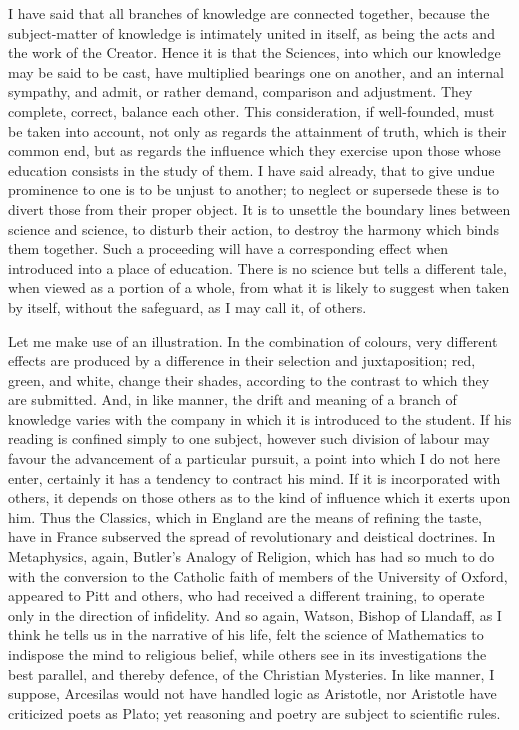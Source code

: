 I have said that all branches of knowledge are connected together,
because the subject-matter of knowledge is intimately united in
itself, as being the acts and the work of the Creator. Hence it is
that the Sciences, into which our knowledge may be said to be cast,
have multiplied bearings one on another, and an internal sympathy, and
admit, or rather demand, comparison and adjustment. They complete,
correct, balance each other. This consideration, if well-founded, must
be taken into account, not only as regards the attainment of truth,
which is their common end, but as regards the influence which
they exercise upon those whose education consists in the study of
them. I have said already, that to give undue prominence to one is to
be unjust to another; to neglect or supersede these is to divert those
from their proper object. It is to unsettle the boundary lines between
science and science, to disturb their action, to destroy the harmony
which binds them together. Such a proceeding will have a corresponding
effect when introduced into a place of education. There is no science
but tells a different tale, when viewed as a portion of a whole, from
what it is likely to suggest when taken by itself, without the
safeguard, as I may call it, of others.

Let me make use of an illustration. In the combination of colours,
very different effects are produced by a difference in their selection
and juxtaposition; red, green, and white, change their shades,
according to the contrast to which they are submitted. And, in like
manner, the drift and meaning of a branch of knowledge varies with the
company in which it is introduced to the student. If his reading is
confined simply to one subject, however such division of labour may
favour the advancement of a particular pursuit, a point into which I
do not here enter, certainly it has a tendency to contract his mind.
If it is incorporated with others, it depends on those others as to
the kind of influence which it exerts upon him. Thus the Classics,
which in England are the means of refining the taste, have in France
subserved the spread of revolutionary and deistical doctrines. In
Metaphysics, again, Butler's Analogy of Religion, which has had so
much to do with the conversion to the Catholic faith of members of the
University of Oxford, appeared to Pitt and others, who had received a
different training, to operate only in the direction of infidelity.
And so again, Watson, Bishop of Llandaff, as I think he tells us
in the narrative of his life, felt the science of Mathematics to
indispose the mind to religious belief, while others see in its
investigations the best parallel, and thereby defence, of the
Christian Mysteries. In like manner, I suppose, Arcesilas would not
have handled logic as Aristotle, nor Aristotle have criticized poets
as Plato; yet reasoning and poetry are subject to scientific rules.

